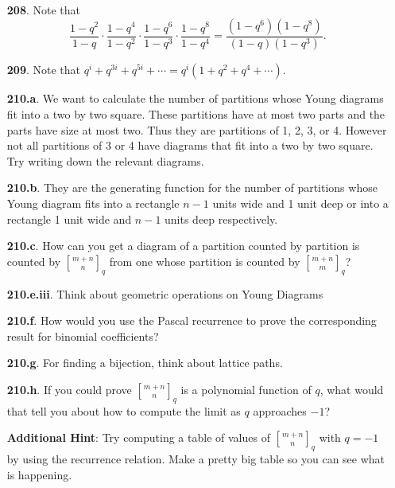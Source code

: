 \documentclass[10pt,]{book}
\theoremstyle{plain}
\theoremstyle{definition}
\theoremstyle{definition}
\numberwithin{equation}{chapter}
\newcommand{\qchoose}[2]{\genfrac{[}{]}{0pt}{}{#1}{#2}_q}
\begin{document}
\begin{itemize}[itemsep=1em]
\item[\textbf{208}.]\hypertarget{p-1181}{}%
Note that%
\begin{equation*}
\frac{1-q^2}{1-q}\cdot \frac{1-q^4}{1-q^2}\cdot \frac{1-q^6}{1-q^3}\cdot \frac{1-q^8}{1-q^4} = \frac{(1-q^6)(1-q^8)}{(1-q)(1-q^3)} \text{.}
\end{equation*}
%

\item[\textbf{209}.]\hypertarget{p-1184}{}%
Note that \(q^i + q^{3i} + q^{5i} + \cdots = q^i (1 + q^2 + q^4 + \cdots)\).%

\item[\textbf{210.a}.]\hypertarget{p-1188}{}%
We want to calculate the number of partitions whose Young diagrams fit into a two by two square. These partitions have at most two parts and the parts have size at most two. Thus they are partitions of 1, 2, 3, or 4. However not all partitions of 3 or 4 have diagrams that fit into a two by two square. Try writing down the relevant diagrams.%

\item[\textbf{210.b}.]\hypertarget{p-1191}{}%
They are the generating function for the number of partitions whose Young diagram fits into a rectangle \(n - 1\) units wide and 1 unit deep or into a rectangle 1 unit wide and \(n - 1\) units deep respectively.%

\item[\textbf{210.c}.]\hypertarget{p-1194}{}%
How can you get a diagram of a partition counted by partition is counted by \(\qchoose{m+n}{n}\) from one whose partition is counted by \(\qchoose{m+n}{m}\)?%

\item[\textbf{210.e.iii}.]\hypertarget{p-1206}{}%
Think about geometric operations on Young Diagrams%

\item[\textbf{210.f}.]\hypertarget{p-1209}{}%
How would you use the Pascal recurrence to prove the corresponding result for binomial coefficients?%

\item[\textbf{210.g}.]\hypertarget{p-1213}{}%
For finding a bijection, think about lattice paths.%

\item[\textbf{210.h}.]\hypertarget{p-1216}{}%
If you could prove \(\qchoose{m+n}{n}\) is a polynomial function of \(q\), what would that tell you about how to compute the limit as \(q\) approaches \(-1\)?%

\par\smallskip
\noindent\textbf{Additional Hint}: \hypertarget{p-1217}{}%
Try computing a table of values of \(\qchoose{m+n}{n}\) with \(q=-1\) by using the recurrence relation. Make a pretty big table so you can see what is happening.%


\end{itemize}
\end{document}
